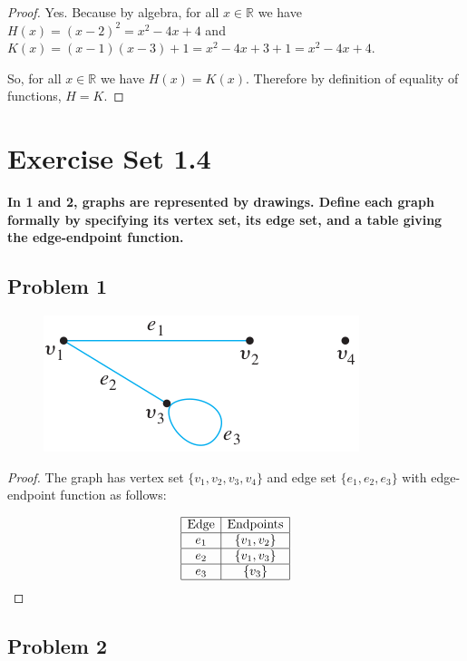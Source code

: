\documentclass[14pt]{extarticle}
\newcommand{\R}{\mathbb{R}}
\begin{document}
\begin{proof}
Yes. Because by algebra, for all $x \in \R$ we have
$H(x) = (x - 2)^2 = x^2 - 4x + 4$ and
$K(x) = (x - 1)(x - 3) + 1 = x^2 - 4x + 3 + 1 = x^2 - 4x + 4$.

So, for all $x \in \R$ we have $H(x) = K(x)$. Therefore by definition of
equality of functions, $H = K$.
\end{proof}

\section {Exercise Set 1.4}

{\bf In 1 and 2, graphs are represented by drawings. Define each graph
formally by specifying its vertex set, its edge set, and a table giving the
edge-endpoint function.}

\subsection{Problem 1}

\begin{figure}[ht!]
\centering
\includegraphics[scale=0.5]{../images/1.4.1.png}
\end{figure}

\begin{proof}
The graph has vertex set $\{v_1, v_2, v_3, v_4\}$ and edge set
$\{e_1, e_2, e_3\}$ with edge-endpoint function as follows:

$$
\begin{array}{|c|c|}
\hline
\text{Edge} & \text{Endpoints} \\
\hline
e_1 & \{v_1, v_2\} \\
\hline
e_2 & \{v_1, v_3\} \\
\hline
e_3 & \{v_3\} \\
\hline
\end{array}
$$
\end{proof}

\subsection{Problem 2}
\end{document}
